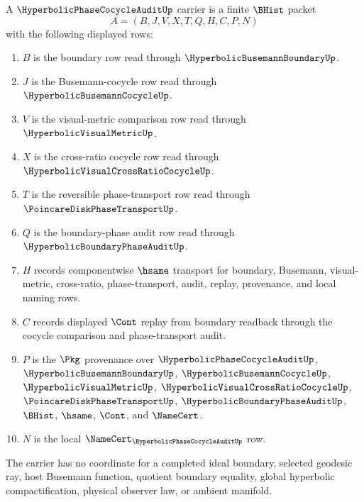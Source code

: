 \begin{definition}
\label{def:hyperbolic-phase-cocycle-audit-carrier}
A $\HyperbolicPhaseCocycleAuditUp$ carrier is a finite $\BHist$ packet
$$
A=(B,J,V,X,T,Q,H,C,P,N)
$$
with the following displayed rows:
\begin{enumerate}
\item $B$ is the boundary row read through $\HyperbolicBusemannBoundaryUp$.
\item $J$ is the Busemann-cocycle row read through $\HyperbolicBusemannCocycleUp$.
\item $V$ is the visual-metric comparison row read through $\HyperbolicVisualMetricUp$.
\item $X$ is the cross-ratio cocycle row read through $\HyperbolicVisualCrossRatioCocycleUp$.
\item $T$ is the reversible phase-transport row read through $\PoincareDiskPhaseTransportUp$.
\item $Q$ is the boundary-phase audit row read through $\HyperbolicBoundaryPhaseAuditUp$.
\item $H$ records componentwise $\hsame$ transport for boundary, Busemann, visual-metric, cross-ratio, phase-transport, audit, replay, provenance, and local naming rows.
\item $C$ records displayed $\Cont$ replay from boundary readback through the cocycle comparison and phase-transport audit.
\item $P$ is the $\Pkg$ provenance over $\HyperbolicPhaseCocycleAuditUp$, $\HyperbolicBusemannBoundaryUp$, $\HyperbolicBusemannCocycleUp$, $\HyperbolicVisualMetricUp$, $\HyperbolicVisualCrossRatioCocycleUp$, $\PoincareDiskPhaseTransportUp$, $\HyperbolicBoundaryPhaseAuditUp$, $\BHist$, $\hsame$, $\Cont$, and $\NameCert$.
\item $N$ is the local $\NameCert_{\HyperbolicPhaseCocycleAuditUp}$ row.
\end{enumerate}
The carrier has no coordinate for a completed ideal boundary, selected geodesic ray, host Busemann function, quotient boundary equality, global hyperbolic compactification, physical observer law, or ambient manifold.
\end{definition}

